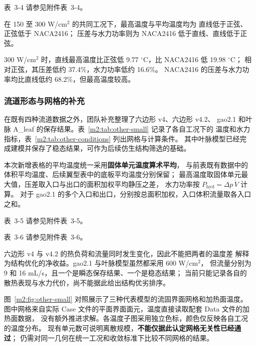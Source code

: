 \documentclass[UTF8]{midterm}
\makeatletter
\newcommand{\submissionnumber}[1]{\def\@currentlabel{#1}}
\makeatother
\begin{document}
\par\noindent \begingroup\submissionnumber{3-4}\label{m2:tab:results}\endgroup 表~3-4 请参见附件表~3-4。\par


在 150 至 300 W/cm$^2$ 的共同工况下，最高温度与平均温度均为
直线低于正弦、正弦低于 NACA2416；
压差与水力功率则为 NACA2416 低于直线、直线低于正弦。

300 W/cm$^2$ 时，直线最高温度比正弦低 9.77 $^\circ$C，比 NACA2416 低 19.98 $^\circ$C；
相对正弦，其压差低约 37.4\%，水力功率低约 16.6\%。
NACA2416 的压差与水力功率均比直线低约 68.2\%，但最高温度较高。


\subsubsection{流道形态与网格的补充}
在既有四种流道数据之外，团队补充整理了六边形 v4、六边形 v4.2、
gao2.1 和叶脉 A\_leaf 的保存结果。表~\ref{m2:tab:other-small} 记录了各自工况下的
温度和水力指标，表~\ref{m2:tab:other-conditions} 列出网格与计算条件。
其中叶脉模型已经完成建模并保存了稳态结果，可作为后续仿生结构筛选的基础。

本次新增表格的平均温度统一采用\textbf{固体单元温度算术平均}，
与前表既有数据中的体积平均温度、后续翼型表中的底板平均温度分别保留；
最高温度取固体单元最大值，压差取入口与出口的面积加权平均静压之差，
水力功率按 $P_{\mathrm{hyd}}=\Delta p\,\dot V$ 计算。
对于 gao2.1 的多个入口和出口，分别按总面积加权，入口体积流量取各入口之和。

\par\noindent \begingroup\submissionnumber{3-5}\label{m2:tab:other-small}\endgroup 表~3-5 请参见附件表~3-5。\par



\par\noindent \begingroup\submissionnumber{3-6}\label{m2:tab:other-conditions}\endgroup 表~3-6 请参见附件表~3-6。\par


六边形 v4 与 v4.2 的热负荷和流量同时发生变化，因此不能把两者的温度差
解释为结构优化的净收益。gao2.1 与叶脉模型虽然都采用 600 W/cm$^2$，
但流量分别为 9 和 16 mL/s，且一个是瞬态保存结果、一个是稳态结果；
当前只能记录各自的散热表现与水力代价，尚不能据此给出结构优劣排序。

图~\ref{m2:fig:other-small} 对照展示了三种代表模型的流固界面网格和加热面温度。
图中网格来自实际 Case 文件的平面界面面元，温度直接读取配套 Data 文件的加热面数据，
没有额外推进求解。各温度子图采用独立色标，颜色仅反映各自工况的温度分布。
现有单元数可说明离散规模，\textbf{不能仅据此认定网格无关性已经通过}；
仍需对同一几何在统一工况和收敛标准下比较不同网格的结果。
\end{document}
